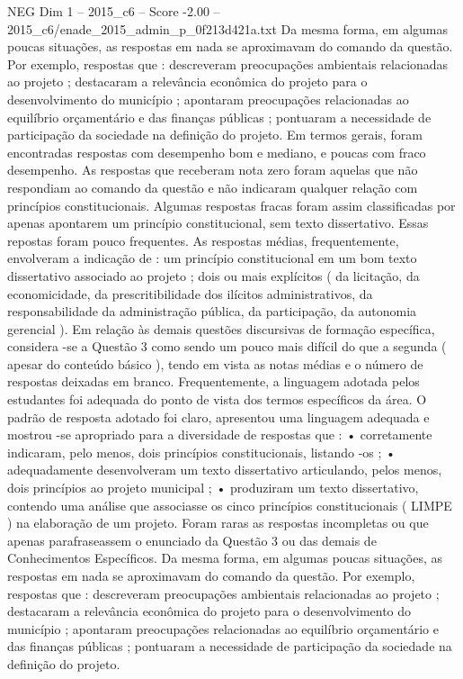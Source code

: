 \begin{textsample}{NEG Dim 1 – 2015\_c6 – Score -2.00 – 2015\_c6/enade\_2015\_admin\_p\_0f213d421a.txt}
Da mesma forma, em algumas poucas situações, as respostas em nada se aproximavam do comando da questão.
Por exemplo, respostas que : descreveram preocupações ambientais relacionadas ao projeto ; destacaram a relevância econômica do projeto para o desenvolvimento do município ; apontaram preocupações relacionadas ao equilíbrio orçamentário e das finanças públicas ; pontuaram a necessidade de participação da sociedade na definição do projeto.
Em termos gerais, foram encontradas respostas com desempenho bom e mediano, e poucas com fraco desempenho.
As respostas que receberam nota zero foram aquelas que não respondiam ao comando da questão e não indicaram qualquer relação com princípios constitucionais.
Algumas respostas fracas foram assim classificadas por apenas apontarem um princípio constitucional, sem texto dissertativo.
Essas repostas foram pouco frequentes.
As respostas médias, frequentemente, envolveram a indicação de : um princípio constitucional em um bom texto dissertativo associado ao projeto ; dois ou mais explícitos ( da licitação, da economicidade, da prescritibilidade dos ilícitos administrativos, da responsabilidade da administração pública, da participação, da autonomia gerencial ).
Em relação às demais questões discursivas de formação específica, considera -se a Questão 3 como sendo um pouco mais difícil do que a segunda ( apesar do conteúdo básico ), tendo em vista as notas médias e o número de respostas deixadas em branco.
Frequentemente, a linguagem adotada pelos estudantes foi adequada do ponto de vista dos termos específicos da área.
O padrão de resposta adotado foi claro, apresentou uma linguagem adequada e mostrou -se apropriado para a diversidade de respostas que : • corretamente indicaram, pelo menos, dois princípios constitucionais, listando -os ; • adequadamente desenvolveram um texto dissertativo articulando, pelos menos, dois princípios ao projeto municipal ; • produziram um texto dissertativo, contendo uma análise que associasse os cinco princípios constitucionais ( LIMPE ) na elaboração de um projeto.
Foram raras as respostas incompletas ou que apenas parafraseassem o enunciado da Questão 3 ou das demais de Conhecimentos Específicos.
Da mesma forma, em algumas poucas situações, as respostas em nada se aproximavam do comando da questão.
Por exemplo, respostas que : descreveram preocupações ambientais relacionadas ao projeto ; destacaram a relevância econômica do projeto para o desenvolvimento do município ; apontaram preocupações relacionadas ao equilíbrio orçamentário e das finanças públicas ; pontuaram a necessidade de participação da sociedade na definição do projeto.

\end{textsample}
